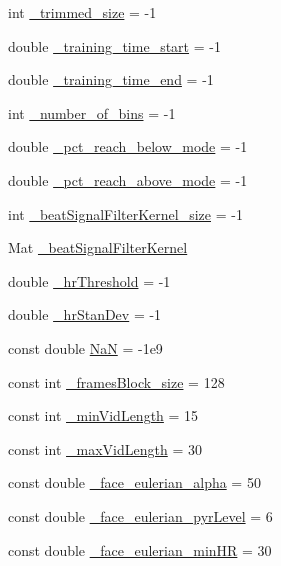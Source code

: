 \begin{DoxyCompactItemize}
int \hyperlink{namespace_m_h_r_a87eb7e22893e5160d4a98344bc8bdff4}{\+\_\+trimmed\+\_\+size} = -\/1
\item 
double \hyperlink{namespace_m_h_r_a32705f521f2a65e0b5c5454b328c26db}{\+\_\+training\+\_\+time\+\_\+start} = -\/1
\item 
double \hyperlink{namespace_m_h_r_a6ee9276234c51d213a3b1631eee5f315}{\+\_\+training\+\_\+time\+\_\+end} = -\/1
\item 
int \hyperlink{namespace_m_h_r_ab3a5de59c2eed470e94ca0e79abd2b5c}{\+\_\+number\+\_\+of\+\_\+bins} = -\/1
\item 
double \hyperlink{namespace_m_h_r_acb8b09915d13e40eba7f00718c40ce6a}{\+\_\+pct\+\_\+reach\+\_\+below\+\_\+mode} = -\/1
\item 
double \hyperlink{namespace_m_h_r_a3b2e38d795c8389fd066cefa0af2ef47}{\+\_\+pct\+\_\+reach\+\_\+above\+\_\+mode} = -\/1
\item 
int \hyperlink{namespace_m_h_r_a5d907d8ef896004dce9f0fd1d47b77e7}{\+\_\+beat\+Signal\+Filter\+Kernel\+\_\+size} = -\/1
\item 
Mat \hyperlink{namespace_m_h_r_ab83e011c36b7688dab5ef024c8894300}{\+\_\+beat\+Signal\+Filter\+Kernel}
\item 
double \hyperlink{namespace_m_h_r_ad65f931bf0d5fecacaa5062119d272bf}{\+\_\+hr\+Threshold} = -\/1
\item 
double \hyperlink{namespace_m_h_r_aa202bc96d234c5ee044f8590ad1dc0ef}{\+\_\+hr\+Stan\+Dev} = -\/1
\item 
const double \hyperlink{namespace_m_h_r_a1f2bac57e6ccaebc6afd932278b163ec}{Na\+N} = -\/1e9
\item 
const int \hyperlink{namespace_m_h_r_a167cff7309df5114f9e72af8b5e820c1}{\+\_\+frames\+Block\+\_\+size} = 128
\item 
const int \hyperlink{namespace_m_h_r_aced573ebf5ae641d5c3a58c9762462fb}{\+\_\+min\+Vid\+Length} = 15
\item 
const int \hyperlink{namespace_m_h_r_a0a7cdb59c1f1e8af6e6b61543c81724d}{\+\_\+max\+Vid\+Length} = 30
\item 
const double \hyperlink{namespace_m_h_r_a0f9c0b966020cdd7ef37cb2207d981ab}{\+\_\+face\+\_\+eulerian\+\_\+alpha} = 50
\item 
const double \hyperlink{namespace_m_h_r_a3eae7b41b03bf25902413f62c5e6545d}{\+\_\+face\+\_\+eulerian\+\_\+pyr\+Level} = 6
\item 
const double \hyperlink{namespace_m_h_r_a95e1651df07df85f364ac713aac7a53b}{\+\_\+face\+\_\+eulerian\+\_\+min\+H\+R} = 30
\item 

\end{DoxyCompactItemize}
